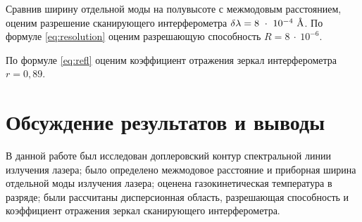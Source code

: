 \documentclass[a4paper, 12pt]{article}
\begin{document}
Сравнив ширину отдельной моды на полувысоте с межмодовым расстоянием, оценим разрешение сканирующего интерферометра $\delta{\lambda} = 8~\cdot~10^{-4}~\text{\r{A}}$.  По формуле \eqref{eq:resolution} оценим разрешающую способность $R = 8~\cdot~10^{-6}$.

По формуле \eqref{eq:refl} оценим коэффициент отражения зеркал интерферометра $r = 0,89$.

\section{Обсуждение результатов и выводы}

В данной работе был исследован доплеровский контур спектральной линии излучения лазера; было определено межмодовое расстояние и приборная ширина отдельной моды излучения лазера; оценена газокинетическая температура в разряде; были рассчитаны дисперсионная область, разрешающая способность и коэффициент отражения зеркал сканирующего интерферометра.
\end{document}
